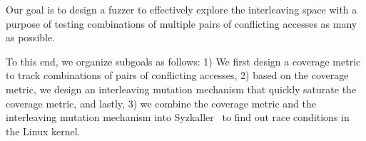 %
Our goal is to design a fuzzer to effectively explore the interleaving
space with a purpose of testing combinations of multiple pairs of
conflicting accesses as many as possible.
%

To this end, we organize subgoals as follows:
%
1) We first design a coverage metric to track combinations of pairs of
conflicting accesses,
%
2) based on the coverage metric, we design an interleaving mutation
  mechanism that quickly saturate the
coverage metric, and lastly,
%
3) we combine the coverage metric and the interleaving mutation
mechanism into Syzkaller~\cite{syzkaller} to find out race conditions
in the Linux kernel.



%



